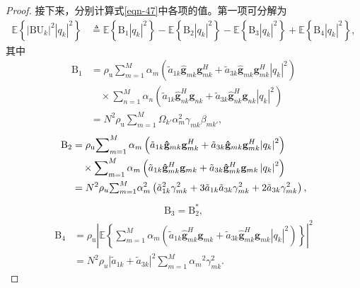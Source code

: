 \begin{proof}
接下来，分别计算式\eqref{eqn-47}中各项的值。第一项可分解为
\begin{align}\label{eqn-48}\mathbb{E}\left\{ {{{\left| {\text{BU}_k} \right|}^2}{{\left| {{q_k}} \right|}^2}} \right\} &\triangleq \mathbb{E}\left\{ {{{\text{B}_1}{\left| {{q_k}} \right|}^2}} \right\} - \mathbb{E}\left\{ {{{\text{B}_2}{\left| {{q_k}} \right|}^2}} \right\} - \mathbb{E}\left\{ {{{\text{B}_3}{\left| {{q_k}} \right|}^2}} \right\} + \mathbb{E}\left\{ {{{\text{B}_4}{\left| {{q_k}} \right|}^2}} \right\},\end{align}
其中
\begin{align}{\text{B}_1} &= {\rho _\text{u}} { \mathop\sum\nolimits_{m = 1}^M {\alpha _m}\left(\tilde{a}_{1k}{{{\mathbf{\hat g}}}_{mk}}{\mathbf{g}}_{mk}^H + \tilde{a}_{3k}{{{\mathbf{\hat g}}}_{mk}}{\mathbf{g}}_{mk}^H{{\left| {{q_k}} \right|}^2}\right)}\nonumber\\
	&\quad\times{\mathop\sum\nolimits_{n = 1}^M {\alpha _n}\left({\tilde{a}_{1k}}{\mathbf{\hat g}}_{nk}^H{{\mathbf{g}}_{nk}} + {\tilde{a}_{3k}}{\mathbf{\hat g}}_{nk}^H{{\mathbf{g}}_{nk}}\left | q_k \right |^2 \right)}\nonumber\\
&={N^2}{\rho _\text{u}} {\textstyle \sum_{m=1}^{M}}  {\Omega _{k'} \alpha _m^2{\gamma _{mk}}{\beta _{mk'}}},\end{align}
\begin{align}{\text{B}_2} &= {\rho _\text{u}} {\mathop \sum \nolimits_{m = 1}^M {\alpha _m}\left(\tilde{a}_{1k}{{{\mathbf{\hat g}}}_{mk}}{\mathbf{g}}_{mk}^H + \tilde{a}_{3k}{{{\mathbf{\hat g}}}_{mk}}{\mathbf{g}}_{mk}^H{{\left| {{q_k}} \right|}^2}\right)} \nonumber\\
	&\quad\times {\mathop \sum \nolimits_{{\rm{m}} = 1}^M {\alpha _m}\left({\tilde{a}_{1k}}{\mathbf{\hat g}}_{mk}^H{{\mathbf{g}}_{mk}} + {\tilde{a}_{3k}}{\mathbf{\hat g}}_{mk}^H{{\mathbf{g}}_{mk}}\left | q_k \right |^2 \right)}\nonumber\\
&=N^2\rho _u {\textstyle \sum_{m=1}^{M}} \alpha _m^2\left ( \tilde{a}_{1k}^2\gamma _{mk}^2+3\tilde{a}_{1k}\tilde{a}_{3k}\gamma _{mk}^2 +2\tilde{a}_{3k}\gamma _{mk}^2   \right ) , \end{align}
\begin{equation}\begin{aligned}{\text{B}_3} = \text{B}_2^*,\end{aligned}\end{equation}
\begin{align}{\text{B}_4} &= {\rho _\text{u}}{\left| {\mathbb{E}\left\{ {\mathop \sum \nolimits_{m = 1}^M {\alpha _m}\left({\tilde{a}_{1k}}{\mathbf{\hat g}}_{mk}^H{{\mathbf{g}}_{mk}} + {\tilde{a}_{3k}}{\mathbf{\hat g}}_{mk}^H{{\mathbf{g}}_{mk}}{{\left| {{q_k}} \right|}^2}\right)} \right\}} \right|^2} \nonumber\\
	&=N^2\rho _u\left | {\tilde{a}_{1k}} + {\tilde{a}_{3k}} \right |^2 { {\textstyle \sum_{m=1}^{M}}  {\alpha _m}^2{\gamma _{mk}^2}}.\end{align}


\end{proof}
